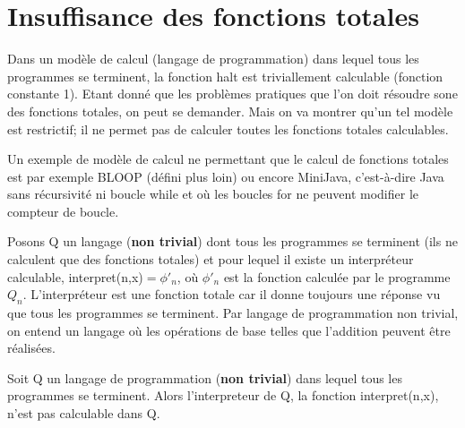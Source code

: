 
\section{Insuffisance des fonctions totales}
\label{sub:insuffisance_des_fonctions_totales}
Dans un modèle de calcul (langage de programmation) dans lequel tous les programmes se terminent, la fonction halt est triviallement calculable (fonction constante 1).  Etant donné que les problèmes pratiques que l'on doit résoudre sone des fonctions totales, on peut se demander.  Mais on va montrer qu'un tel modèle est restrictif; il ne permet pas de calculer toutes les fonctions totales calculables.

\begin{myexem}
Un exemple de modèle de calcul ne permettant que le calcul de fonctions totales est par exemple BLOOP (défini plus loin) ou encore MiniJava, c'est-à-dire Java sans récursivité ni boucle while et où les boucles for ne peuvent modifier le compteur de boucle. 
\end{myexem}

Posons Q un langage (\textbf{non trivial}) dont tous les programmes se terminent (ils ne calculent que des fonctions totales) et pour
lequel il existe un interpréteur calculable, interpret(n,x)${} =\phi'_n$, où 
$\phi'_n$ est la fonction calculée par le programme $Q_n$.  L'interpréteur est une fonction totale car il donne toujours une réponse vu que tous les programmes se terminent. Par langage de programmation non trivial, on entend un langage où les opérations de base telles que l'addition peuvent être réalisées.

\begin{mytheo}
	\label{Hoare_Allison}
Soit Q un langage de programmation (\textbf{non trivial}) dans lequel tous les programmes se terminent.	Alors l'interpreteur de Q, la fonction interpret(n,x), n'est pas calculable dans Q.
\end{mytheo}

